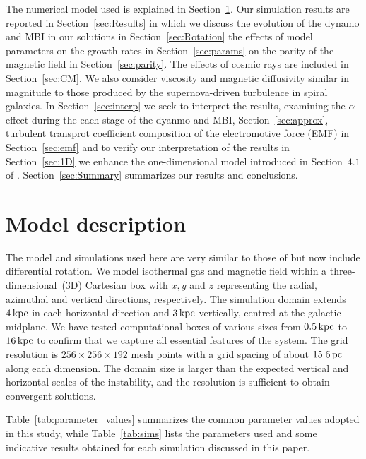 \documentclass[fleqn,usenatbib]{mnras}
\newcommand{\p}{\,{\rm pc}}     %
\newcommand{\kpc}{\,{\rm kpc}}  %
\begin{document}
The numerical model used is explained in Section~\ref{sec:Equations}.  Our
simulation results are reported in Section~\ref{sec:Results} in which we
discuss the evolution of the dynamo and MBI in our solutions in
Section~\ref{sec:Rotation} the effects of model parameters on the growth rates
in Section~\ref{sec:params} on  the parity of the magnetic field in
Section~\ref{sec:parity}. The effects of cosmic rays are included in
Section~\ref{sec:CM}.  We also consider viscosity and magnetic diffusivity
similar in magnitude to those produced by the supernova-driven turbulence in
spiral galaxies. In Section~\ref{sec:interp} we seek to interpret the
results{, examining the $\alpha$-effect during the each stage of the dyanmo
and MBI, Section~\ref{sec:approx}, turbulent transprot coefficient composition
of} the electromotive force (EMF) in Section~\ref{sec:emf} {and to verify}
our interpretation of the results in Section~\ref{sec:1D} {we enhance} the
one-dimensional model introduced in Section~$4.1$ of \citet{QSTGB23}.
Section~\ref{sec:Summary} summarizes our results {and conclusions}.

\section{Model description}\label{sec:Equations}

The model and simulations used here are very similar to those of
\citet{QSTGB23} but now include differential rotation. We model isothermal gas
and magnetic field within a {three-dimensional (3D)} Cartesian box with
$x,y$ and $z$ representing the radial, azimuthal and vertical directions,
respectively. The simulation domain extends $4\kpc$ in each horizontal
direction and $3\kpc$ vertically, centred at the galactic midplane. We have
tested computational boxes of various sizes from $0.5\kpc$ to $16\kpc$ to
confirm that we capture all essential features of the system. The grid
resolution is $256\times256\times192$ mesh points with a grid spacing of about
$15.6 \p$ along each dimension. The domain size is larger than the expected
vertical and horizontal scales of the instability, and the resolution is
sufficient to obtain convergent solutions.

Table~\ref{tab:parameter_values} summarizes the {common} parameter values
adopted in this study, while Table~\ref{tab:sims} {lists the parameters used
and some indicative results obtained for each simulation} discussed in this
paper.
\end{document}
